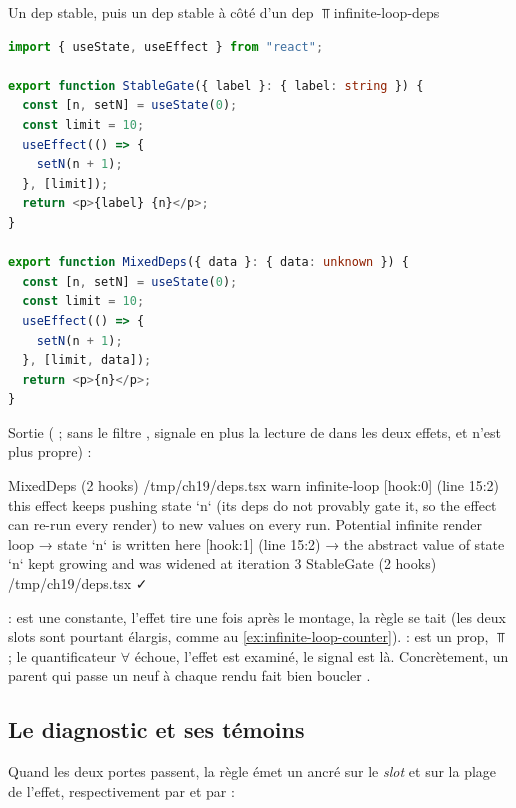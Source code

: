 \begin{exemple}{Un dep stable, puis un dep stable à côté d'un dep $\Top$}{infinite-loop-deps}
\begin{lstlisting}[language=TypeScript,caption={\file{/tmp/ch19/deps.tsx}},label={lst:infinite-loop-deps-tsx}]
import { useState, useEffect } from "react";

export function StableGate({ label }: { label: string }) {
  const [n, setN] = useState(0);
  const limit = 10;
  useEffect(() => {
    setN(n + 1);
  }, [limit]);
  return <p>{label} {n}</p>;
}

export function MixedDeps({ data }: { data: unknown }) {
  const [n, setN] = useState(0);
  const limit = 10;
  useEffect(() => {
    setN(n + 1);
  }, [limit, data]);
  return <p>{n}</p>;
}
\end{lstlisting}
Sortie ( ; sans le filtre ,  signale en plus la lecture de  dans les deux effets, et  n'est plus propre) :
\begin{sortie}
  MixedDeps  (2 hooks)  /tmp/ch19/deps.tsx
    warn   infinite-loop  [hook:0]  (line 15:2)  this effect keeps pushing state `n` (its deps do not provably gate it, so the effect can re-run every render) to new values on every run. Potential infinite render loop
       → state `n` is written here [hook:1] (line 15:2)
       → the abstract value of state `n` kept growing and was widened at iteration 3
  StableGate  (2 hooks)  /tmp/ch19/deps.tsx  ✓
\end{sortie}
 :  est une constante, l'effet tire une fois après le montage, la règle se tait (les deux slots sont pourtant élargis, comme au \cref{ex:infinite-loop-counter}).  :  est un prop, $\Top$ ; le quantificateur $\forall$ échoue, l'effet est examiné, le signal est là. Concrètement, un parent qui passe un  neuf à chaque rendu fait bien boucler .
\end{exemple}

\subsection{Le diagnostic et ses témoins}

Quand les deux portes passent, la règle émet un \Warning{} ancré sur le \emph{slot} et sur la plage de l'effet, respectivement par  et par  :

